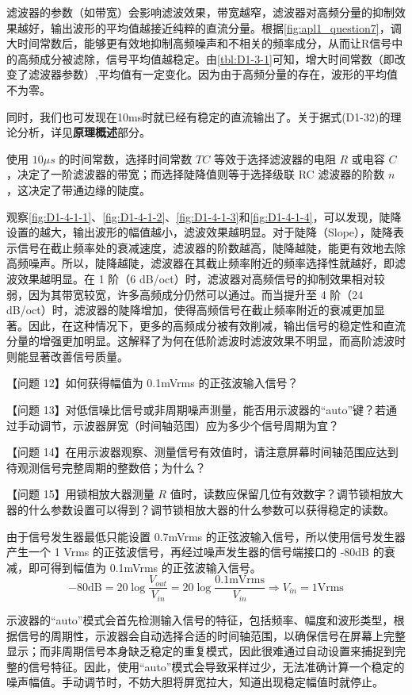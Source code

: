 滤波器的参数（如带宽）会影响滤波效果，带宽越窄，滤波器对高频分量的抑制效果越好，输出波形的平均值越接近纯粹的直流分量。根据\cref{fig:apl1_question7}，调大时间常数后，能够更有效地抑制高频噪声和不相关的频率成分，从而让R信号中的高频成分被滤除，信号平均值越稳定。由\cref{tbl:D1-3-1}可知，增大时间常数（即改变了滤波器参数）,平均值有一定变化。因为由于高频分量的存在，波形的平均值不为零。

同时，我们也可发现在10ms时就已经有稳定的直流输出了。关于据式(D1-32)的理论分析，详见\textbf{原理概述}部分。

使用  $10\mu s$ 的时间常数，选择时间常数 \( TC \) 等效于选择滤波器的电阻 \( R \) 或电容 \( C \)，决定了一阶滤波器的带宽；而选择陡降值则等于选择级联 RC 滤波器的阶数 \( n \)，这决定了带通边缘的陡度。

观察\cref{fig:D1-4-1-1}、\cref{fig:D1-4-1-2}、\cref{fig:D1-4-1-3}和\cref{fig:D1-4-1-4}，可以发现，陡降设置的越大，输出波形的幅值越小，滤波效果越明显。对于陡降（Slope），陡降表示信号在截止频率处的衰减速度，滤波器的阶数越高，陡降越陡，能更有效地去除高频噪声。所以，陡降越陡，滤波器在其截止频率附近的频率选择性就越好，即滤波效果越明显。在 1 阶（6 dB/oct）时，滤波器对高频信号的抑制效果相对较弱，因为其带宽较宽，许多高频成分仍然可以通过。而当提升至 4 阶（24 dB/oct）时，滤波器的陡降增加，使得高频信号在截止频率附近的衰减更加显著。因此，在这种情况下，更多的高频成分被有效削减，输出信号的稳定性和直流分量的增强更加明显。这解释了为何在低阶滤波时滤波效果不明显，而高阶滤波时则能显著改善信号质量。


\begin{ubox}{}
	【问题 12】如何获得幅值为 0.1mVrms 的正弦波输入信号？
	
	【问题 13】对低信噪比信号或非周期噪声测量，能否用示波器的“auto”键？若通过手动调节，示波器屏宽（时间轴范围）应为多少个信号周期为宜？
	
	【问题 14】在用示波器观察、测量信号有效值时，请注意屏幕时间轴范围应达到待观测信号完整周期的整数倍；为什么？
	
	【问题 15】用锁相放大器测量 $R$ 值时，读数应保留几位有效数字？调节锁相放大器的什么参数设置可以得到？调节锁相放大器的什么参数可以获得稳定的读数。
\end{ubox}
由于信号发生器最低只能设置 0.7mVrms 的正弦波输入信号，所以使用信号发生器产生一个 1 Vrms 的正弦波信号，再经过噪声发生器的信号端接口的 -80dB 的衰减，即可得到幅值为 0.1mVrms 的正弦波输入信号。
\[
- 80 \mathrm{dB} = 20 \log \frac{V_{out}}{V_{in}} = 20 \log \frac{0.1 \mathrm{mVrms}}{V_{in}}\Rightarrow V_{in} = 1 \mathrm{Vrms}
\]

示波器的“auto”模式会首先检测输入信号的特征，包括频率、幅度和波形类型，根据信号的周期性，示波器会自动选择合适的时间轴范围，以确保信号在屏幕上完整显示；而非周期信号本身缺乏稳定的重复模式，因此很难通过自动设置来捕捉到完整的信号特征。因此，使用“auto”模式会导致采样过少，无法准确计算一个稳定的噪声幅值。手动调节时，不妨大胆将屏宽拉大，知道出现稳定幅值时就停止。

